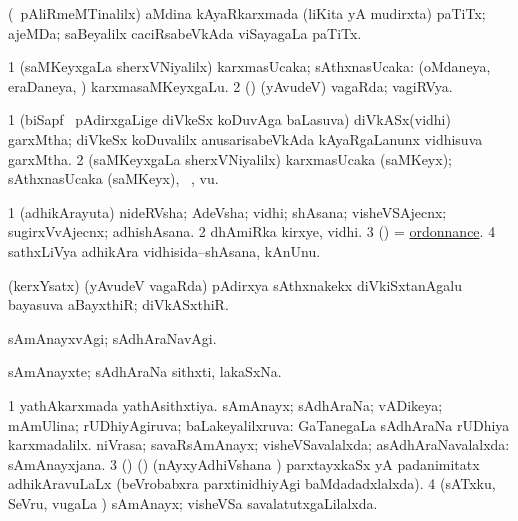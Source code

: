 \bentry
{}
\gl{\nA}
\bmng
(\kanmu\ pAliRmeMTinalilx) aMdina kAyaRkarxmada (liKita yA mudirxta) paTiTx; ajeMDa; saBeyalilx caciRsabeVkAda viSayagaLa paTiTx. 
\emng
\eentry

\bentry
{}
\gl{\gu}
\bmng
\bnum
\num{1} (saMKeyxgaLa sherxVNiyalilx) karxmasUcaka; sAthxnasUcaka:  (oMdaneya, eraDaneya, \mo) karxmasaMKeyxgaLu. 
\num{2} (\jiVvi) (yAvudeV) vagaRda; vagiRVya. 
\enum
\emng
\eentry

\bentry
{}
\gl{\nA}
\bmng
\bnum
\num{1} (biSapf \mo\ pAdirxgaLige diVkeSx koDuvAga baLasuva) diVkASx(vidhi) garxMtha; diVkeSx koDuvalilx anusarisabeVkAda kAyaRgaLanunx vidhisuva garxMtha. 
\num{2} (saMKeyxgaLa sherxVNiyalilx) karxmasUcaka (saMKeyx); sAthxnasUcaka (saMKeyx), \udA\ , \mo vu. 
\enum
\emng
\eentry

\bentry
{}
\gl{\nA}
\bmng
\bnum
\num{1} (adhikArayuta) nideRVsha; AdeVsha; vidhi; shAsana; visheVSAjecnx; sugirxVvAjecnx; adhishAsana. 
\num{2} dhAmiRka kirxye, vidhi. 
\num{3} (\pArxparx) = \hyperlink{ordonnance}{ordonnance}. 
\num{4} sathxLiVya adhikAra vidhisida--shAsana, kAnUnu. 
\enum
\emng
\eentry

\bentry
{}
\gl{\nA}
\bmng
(kerxYsatx) (yAvudeV vagaRda) pAdirxya sAthxnakekx diVkiSxtanAgalu bayasuva aBayxthiR; diVkASxthiR. 
\emng
\eentry

\bentry
{}
\gl{\kirxvi}
\bmng
sAmAnayxvAgi; sAdhAraNavAgi. 
\emng
\eentry

\bentry
{}
\gl{\nA}
\bmng
sAmAnayxte; sAdhAraNa sithxti, lakaSxNa. 
\emng
\eentry

\bentry
{}
\gl{\gu}
\bmng
\bnum
\num{1} yathAkarxmada yathAsithxtiya. 
\banum
{} sAmAnayx; sAdhAraNa; vADikeya; mAmUlina; rUDhiyAgiruva; baLakeyalilxruva:  GaTanegaLa sAdhAraNa rUDhiya karxmadalilx. 
 niVrasa; savaRsAmAnayx; visheVSavalalxda; asAdhAraNavalalxda:  sAmAnayxjana. 
\eanum
\numie
\num{3} (\birx) (\nAyxshA) (nAyxyAdhiVshana \vi) parxtayxkaSx yA padanimitatx adhikAravuLaLx (beVrobabxra parxtinidhiyAgi baMdadadxlalxda). 
\num{4} (sATxku, SeVru, \mo vugaLa \vi) sAmAnayx; visheVSa savalatutxgaLilalxda. 
\enum
\emng

